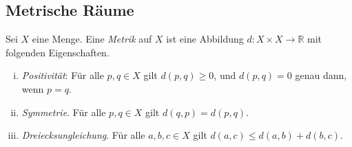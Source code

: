 \documentclass[../main.tex]{subfiles}
\begin{document}
\subsection*{Metrische Räume}
\begin{definition}
  Sei $X$ eine Menge. Eine \emph{Metrik} auf $X$ ist eine
  Abbildung $d \colon X \times X \to \mathbb{R}$
  mit folgenden Eigenschaften.
  \begin{enumerate}[(i)]
    \item \emph{Positivität}: Für alle $p, q \in X$ gilt $d(p, q) \geq 0$, und
      $d(p, q) = 0$ genau dann, wenn $p = q$.
    \item \emph{Symmetrie}. Für alle $p, q \in X$ gilt $d(q, p) = d(p, q)$.
    \item \emph{Dreiecksungleichung}.
      Für alle  $a, b, c \in X$ gilt $d(a, c) \leq d(a, b) +
      d(b, c)$.
  \end{enumerate}
\end{definition}
\end{document}
